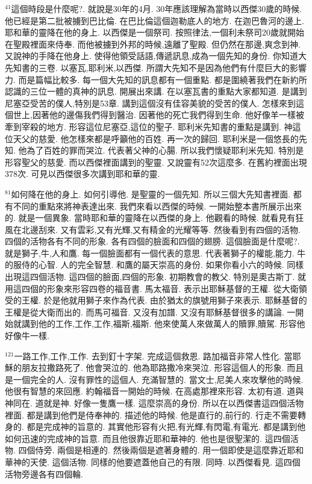 \documentclass{book}
\begin{document}
$^{41}$這個時段是什麼呢?.
就說是30年的4月.
30年應該理解為當時以西傑30歲的時候.
他已經是第二批被擄到巴比倫.
在巴比倫這個迦勒底人的地方.
在迦巴魯河的邊上.
耶和華的靈降在他的身上.
以西傑是一個祭司.
按照律法,一個利未祭司20歲就開始在聖殿裡面來侍奉.
而他被擄到外邦的時候,遠離了聖殿.
但仍然在那邊,爽念到神.
又說神的手降在他身上.
使得他領受話語,傳遞訊息,成為一個先知的身份.
你知道大先知書的三卷.
以塞瓦,耶利米,以西傑.
所謂大先知不是因為他們有什麼巨大的影響力.
而是篇幅比較多.
每一個大先知的訊息都有一個重點.
都是圍繞著我們在新約所認識的三位一體的真神的訊息.
開展出來講.
在以塞瓦書的重點大家都知道.
是講到尼塞亞受苦的僕人,特別是53章.
講到這個沒有佳容美貌的受苦的僕人.
怎樣來到這個世上,因著他的邊傷我們得到醫治.
因著他的死亡我們得到生命.
他好像羊一樣被牽到宰殺的地方.
形容這位尼塞亞,這位的聖子.
耶利米先知書的重點是講到.
神這位天父的慈愛.
他怎樣來都是呼籲他的百姓.
再一次的歸回.
耶利米是一個悠長的先知.
他為了百姓的罪而哭泣.
代表著父神的心腸.
所以我們懷疑耶利米先知.
特別是形容聖父的慈愛.
而以西傑裡面講到的聖靈.
又說靈有52次這麼多.
在舊約裡面出現378次.
可見以西傑很多次講到耶和華的靈.

$^{81}$如何降在他的身上.
如何引導他.
是聖靈的一個先知.
所以三個大先知書裡面.
都有不同的重點來將神表達出來.
我們來看以西傑的時候.
一開始整本書所展示出來的.
就是一個異象.
當時耶和華的靈降在以西傑的身上.
他觀看的時候.
就看見有狂風在北邊刮來.
又有雲彩,又有光輝,又有精金的光耀等等.
然後看到有四個的活物.
四個的活物各有不同的形象.
各有四個的臉面和四個的翅膀.
這個臉面是什麼呢?.
就是獅子,牛,人和鷹.
每一個臉面都有一個代表的意思.
代表著獅子的權能,能力.
牛的服侍的心智.
人的完全智慧.
和鷹的屬天崇高的身份.
如果你看小六的時候.
同樣出現這四個活物.
這四個的臉面,四個的形象.
初期教會的教父.
特別是奧古斯丁.
就用這四個的形象來形容四卷的福音書.
馬太福音.
表示出耶穌基督的王權.
從大衛領受的王權.
於是他就用獅子來作為代表.
由於猶太的旗號用獅子來表示.
耶穌基督的王權是從大衛而出的.
而馬可福音.
又沒有加譜.
又沒有耶穌基督很多的講論.
一開始就講到他的工作,工作,工作,福斯,福斯.
他來使萬人來做萬人的贖罪,贖駕.
形容他好像牛一樣.

$^{121}$一路工作,工作,工作.
去到釘十字架.
完成這個救恩.
路加福音非常人性化.
當耶穌的朋友拉撒路死了.
他會哭泣的.
他為耶路撒冷來哭泣.
形容這個人的形象.
而且是一個完全的人.
沒有罪性的這個人.
充滿智慧的.
當文士,尼美人來攻擊他的時候.
他很有智慧的來回應.
約翰福音一開始的時候.
在高處那裡來形容.
太初有道.
道與神同在.
道就是神.
好像一隻鷹一樣.
這麼崇高的身份.
所以在以西傑書這四個活物裡面.
都是講到他們是侍奉神的.
描述他的時候.
他是直行的,前行的.
行走不需要轉身的.
都是完成神的旨意的.
其實他形容有火把,有光輝,有閃電,有電光.
都是講到他如何迅速的完成神的旨意.
而且他很靠近耶和華神的.
他也是很聖潔的.
這四個活物.
四個侍旁.
兩個是相連的.
然後兩個是遮著身體的.
用一個即使是這麼靠近耶和華神的天使.
這個活物.
同樣的他要遮蓋他自己的有限.
同時.
以西傑看見.
這四個活物旁邊各有四個輪.
\end{document}
